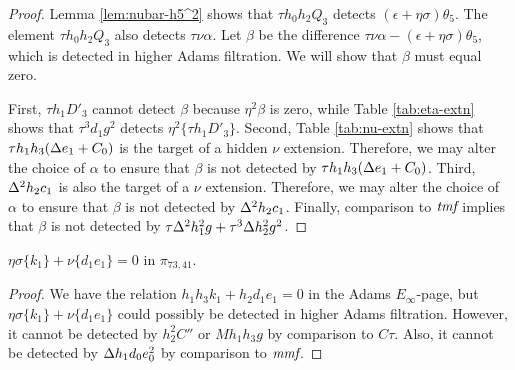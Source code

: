 \begin{proof}
Lemma \ref{lem:nubar-h5^2} shows that
$\tau h_0 h_2 Q_3$ detects $(\epsilon + \eta \sigma) \theta_5$.
The element $\tau h_0 h_2 Q_3$ also detects $\tau \nu \alpha$.
Let $\beta$ be the difference
$\tau \nu \alpha - (\epsilon + \eta \sigma) \theta_5$,
which is detected in higher Adams filtration.
We will show that $\beta$ must equal zero.

First, $\tau h_1 D'_3$ cannot detect $\beta$ because
$\eta^2 \beta$ is zero, while 
Table \ref{tab:eta-extn} shows that $\tau^3 d_1 g^2$ detects
$\eta^2 \{\tau h_1 D'_3\}$.
Second, Table \ref{tab:nu-extn} shows that $\tau h_1 h_3(\Delta e_1 + C_0)$
is the target of a hidden $\nu$ extension.
Therefore, we may alter the choice of $\alpha$
to ensure that $\beta$ is not detected by $\tau h_1 h_3(\Delta e_1 + C_0)$.
Third, $\Delta^2 h_2 c_1$ is also the target of a $\nu$ extension.
Therefore, we may alter the choice of $\alpha$
to ensure that $\beta$ is not detected by $\Delta^2 h_2 c_1$.
Finally, comparison to $\textit{tmf}$ implies that
$\beta$ is not detected by 
$\tau \Delta^2 h_1^2 g + \tau^3 \Delta h_2^2 g^2$. 
\end{proof}




\begin{lemma}
\label{lem:eta-sigma-k1}
$\eta \sigma \{k_1\} + \nu \{d_1 e_1\} = 0$ in
$\pi_{73,41}$.
\end{lemma}

\begin{proof}
We have the relation $h_1 h_3 k_1 + h_2 d_1 e_1 = 0$
in the Adams $E_\infty$-page, but
$\eta \sigma \{k_1\} + \nu\{d_1 e_1\}$ could possibly be 
detected in higher Adams filtration.
However, it cannot be detected by
$h_2^2 C''$ or $M h_1 h_3 g$ by comparison to $C\tau$.
Also, it cannot be detected by $\Delta h_1 d_0 e_0^2$ by comparison
to $\textit{mmf}$. 
\end{proof}

